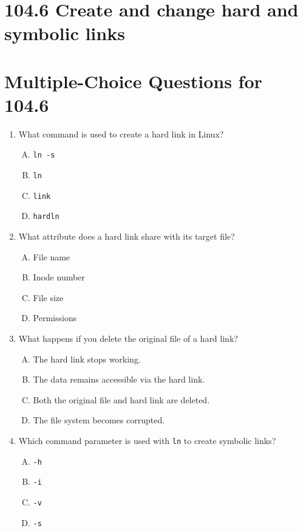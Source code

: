 \documentclass[a4paper]{report}
\begin{document}
\section*{104.6 Create and change hard and symbolic links}

\newpage
\section*{Multiple-Choice Questions for 104.6}
\begin{enumerate}[1.]

    \item What command is used to create a hard link in Linux?  
    \begin{enumerate}[A)]
        \item \texttt{ln -s}  
        \item \texttt{ln}  
        \item \texttt{link}  
        \item \texttt{hardln}  
    \end{enumerate}

    \item What attribute does a hard link share with its target file?  
    \begin{enumerate}[A)]
        \item File name  
        \item Inode number  
        \item File size  
        \item Permissions  
    \end{enumerate}

    \item What happens if you delete the original file of a hard link?  
    \begin{enumerate}[A)]
        \item The hard link stops working.  
        \item The data remains accessible via the hard link.  
        \item Both the original file and hard link are deleted.  
        \item The file system becomes corrupted.  
    \end{enumerate}

    \item Which command parameter is used with \texttt{ln} to create symbolic links?  
    \begin{enumerate}[A)]
        \item \texttt{-h}  
        \item \texttt{-i}  
        \item \texttt{-v}  
        \item \texttt{-s}  
    \end{enumerate}


\end{enumerate}
\end{document}
